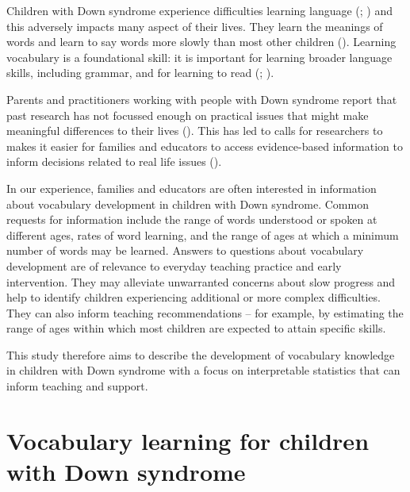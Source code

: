 \documentclass[
  11pt,
  a4paper,
]{report}
\begin{document}
\hfill\break

Children with Down syndrome experience difficulties learning language
(; ) and this adversely impacts many aspect of their lives. They learn
the meanings of words and learn to say words more slowly than most other
children (). Learning vocabulary is a foundational skill: it is
important for learning broader language skills, including grammar, and
for learning to read (; ).

Parents and practitioners working with people with Down syndrome report
that past research has not focussed enough on practical issues that
might make meaningful differences to their lives
(). This has led to calls for researchers to makes it easier for
families and educators to access evidence-based information to inform
decisions related to real life issues
().

In our experience, families and educators are often interested in
information about vocabulary development in children with Down syndrome.
Common requests for information include the range of words understood or
spoken at different ages, rates of word learning, and the range of ages
at which a minimum number of words may be learned. Answers to questions
about vocabulary development are of relevance to everyday teaching
practice and early intervention. They may alleviate unwarranted concerns
about slow progress and help to identify children experiencing
additional or more complex difficulties. They can also inform teaching
recommendations -- for example, by estimating the range of ages within
which most children are expected to attain specific skills.

This study therefore aims to describe the development of vocabulary
knowledge in children with Down syndrome with a focus on interpretable
statistics that can inform teaching and support.

\section{Vocabulary learning for children with Down
syndrome}\label{vocabulary-learning-for-children-with-down-syndrome}
\end{document}
